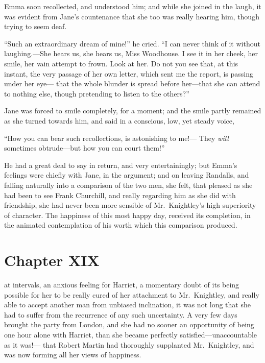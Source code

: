 Emma soon recollected, and understood him; and while she joined
in the laugh, it was evident from Jane's countenance that she
too was really hearing him, though trying to seem deaf.

``Such an extraordinary dream of mine!'' he cried.  ``I can never think
of it without laughing.---She hears us, she hears us, Miss Woodhouse.
I see it in her cheek, her smile, her vain attempt to frown.
Look at her.  Do not you see that, at this instant, the very passage
of her own letter, which sent me the report, is passing under her eye---%
that the whole blunder is spread before her---that she can attend to
nothing else, though pretending to listen to the others?''

Jane was forced to smile completely, for a moment; and the smile
partly remained as she turned towards him, and said in a conscious,
low, yet steady voice,

``How you can bear such recollections, is astonishing to me!---%
They \emph{will} sometimes obtrude---but how you can court them!''

He had a great deal to say in return, and very entertainingly;
but Emma's feelings were chiefly with Jane, in the argument; and on
leaving Randalls, and falling naturally into a comparison of the two men,
she felt, that pleased as she had been to see Frank Churchill,
and really regarding him as she did with friendship, she had never
been more sensible of Mr.\ Knightley's high superiority of character.
The happiness of this most happy day, received its completion, in the
animated contemplation of his worth which this comparison produced.



\chapter{Chapter XIX}


 at intervals, an anxious feeling for Harriet,
a momentary doubt of its being possible for her to be really cured
of her attachment to Mr.\ Knightley, and really able to accept
another man from unbiased inclination, it was not long that she
had to suffer from the recurrence of any such uncertainty.
A very few days brought the party from London, and she had no
sooner an opportunity of being one hour alone with Harriet,
than she became perfectly satisfied---unaccountable as it was!---%
that Robert Martin had thoroughly supplanted Mr.\ Knightley,
and was now forming all her views of happiness.


